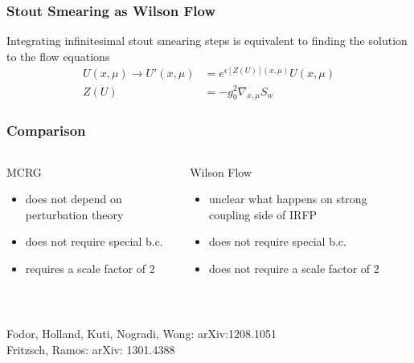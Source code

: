 \begin{frame}
  \frametitle{Stout Smearing as Wilson Flow}
  Integrating infinitesimal stout smearing steps is equivalent to finding the solution to the flow equations
  \begin{align*}
    U(x,\mu)\rightarrow U'(x,\mu)&=e^{\epsilon [Z(U)](x,\mu)}U(x,\mu) \\
    Z(U) &=-g^2_0\nabla_{x,\mu}S_w
  \end{align*}
\end{frame}


\begin{frame}
  \addtocounter{framenumber}{-1}
  \frametitle{Comparison}
  \begin{columns}[T]
    \begin{column}{0.5\textwidth}
      \begin{block}{\centering MCRG}
        \begin{itemize}
          \item does not depend on perturbation theory
          \item does not require special b.c.
          \item requires a scale factor of 2
        \end{itemize}
      \end{block}
    \end{column}
    \begin{column}{0.5\textwidth}
      \begin{block}{\centering Wilson Flow}
        \begin{itemize}
          \item unclear what happens on strong coupling side of IRFP
          \item does not require special b.c.
          \item does not require a scale factor of 2
        \end{itemize}
      \end{block}
    \end{column}
  \end{columns}
  \ \newline
  \begin{flushright}
    Fodor, Holland, Kuti, Nogradi, Wong: arXiv:1208.1051\\
    Fritzsch, Ramos:  arXiv: 1301.4388
  \end{flushright}
\end{frame}

